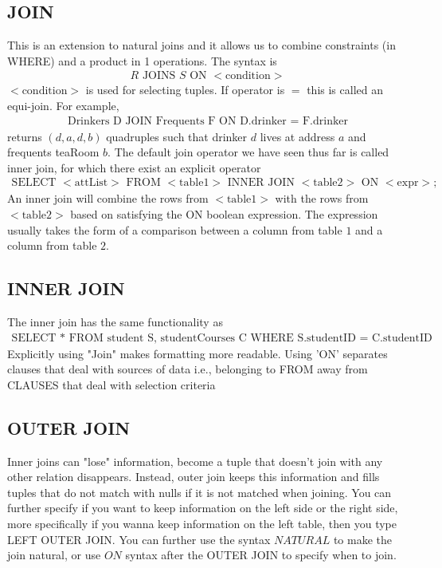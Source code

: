 \documentclass[a4paper]{article}
\theoremstyle{plain}
\theoremstyle{definition}
\theoremstyle{remark}
\begin{document}
\subsection{JOIN}
This is an extension to natural joins and it allows us to combine constraints (in WHERE) and a product in 1 operations. The syntax is
\begin{align*}
	R \text{ JOINS } S \text{ ON }<\text{condition}>
\end{align*}
$<\text{condition}>$ is used for selecting tuples. If operator is $=$ this is called an equi-join. For example,
\begin{align*}
	\text{Drinkers D JOIN Frequents F ON D.drinker = F.drinker}
\end{align*}
returns $(d,a,d,b)$ quadruples such that drinker $d$ lives at address $a$ and frequents teaRoom $b$.
The default join operator we have seen thus far is called inner join, for which there exist an explicit operator
\begin{align*}
	\text{SELECT } <\text{attList}> \text{ FROM } <\text{table1}> \text{ INNER JOIN } <\text{table2}> \text{ ON } <\text{expr}>;
\end{align*}
An inner join will combine the rows from $<\text{table1}>$ with the rows from $<\text{table2}>$ based on satisfying the ON boolean expression. The expression usually takes the form of a comparison between a column from table $1$ and a column from table $2$.
\subsection{INNER JOIN}
The inner join has the same functionality as
\begin{align*}
	\text{SELECT }*\text{ FROM student S, studentCourses C WHERE S.studentID = C.studentID}
\end{align*}
Explicitly using "Join" makes formatting more readable. Using 'ON' separates clauses that deal with sources of data i.e., belonging to FROM away from CLAUSES that deal with selection criteria
\subsection{OUTER JOIN}
Inner joins can "lose" information, become a tuple that doesn't join with any other relation disappears. Instead, outer join keeps this information and fills tuples that do not match with nulls if it is not matched when joining. You can further specify if you want to keep information on the left side or the right side, more specifically if you wanna keep information on the left table, then you type LEFT OUTER JOIN. You can further use the syntax $NATURAL$ to make the join natural, or use $ON$ syntax after the OUTER JOIN to specify when to join.
\end{document}
